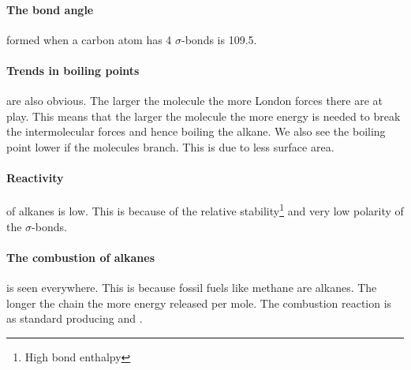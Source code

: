 \documentclass[11pt,a4paper]{memoir}
\begin{document}
	\paragraph{The bond angle} formed when a carbon atom has 4 $\sigma$-bonds is 109.5\degree .
	
	\paragraph{Trends in boiling points} are also obvious. The larger the molecule the more London forces there are at play. This means that the larger the molecule the more energy is needed to break the intermolecular forces and hence boiling the alkane. We also see the boiling point lower if the molecules branch. This is due to less surface area.
	
	\paragraph{Reactivity} of alkanes is low. This is because of the relative stability\footnote{High bond enthalpy} and very low polarity of the $\sigma$-bonds. 
	
	\paragraph{The combustion of alkanes} is seen everywhere. This is because fossil fuels like methane are alkanes. The longer the chain the more energy released per mole. The combustion reaction is as standard producing  and .
	
\end{document}
